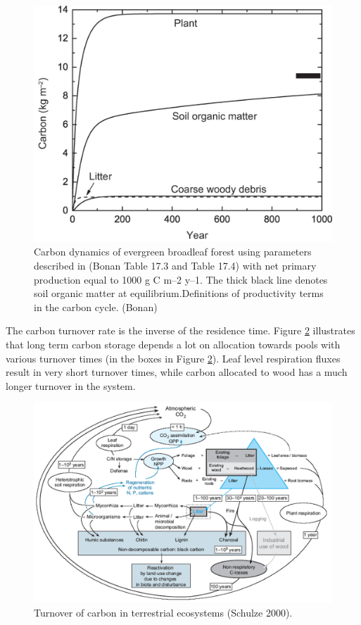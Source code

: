 \documentclass[12pt,oneside]{book}
\begin{document}
\begin{figure}

{\centering \includegraphics[width=0.8\linewidth]{figures/chap5/f55_casa_result} 

}

\caption{Carbon dynamics of evergreen broadleaf forest using parameters described in (Bonan Table 17.3 and Table 17.4) with net primary production equal to 1000 g C m–2 y–1. The thick black line denotes soil organic matter at equilibrium.Definitions of productivity terms in the carbon cycle. (Bonan)}\label{fig:f55}
\end{figure}

The carbon turnover rate is the inverse of the residence time. Figure
\ref{fig:f56} illustrates that long term carbon storage depends a lot on
allocation towards pools with various turnover times (in the boxes in
Figure \ref{fig:f56}). Leaf level respiration fluxes result in very
short turnover times, while carbon allocated to wood has a much longer
turnover in the system.

\begin{figure}

{\centering \includegraphics[width=0.8\linewidth]{figures/chap5/f56_turnover} 

}

\caption{Turnover of carbon in terrestrial ecosystems (Schulze 2000).}\label{fig:f56}
\end{figure}
\end{document}
